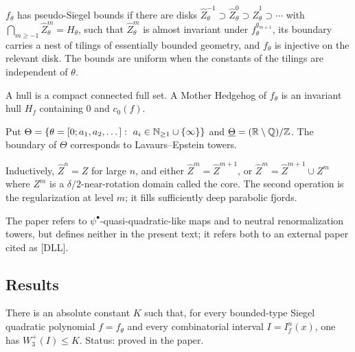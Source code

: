\begin{definition}
\label{def:neutral-pseudo-siegel}
$f_\theta$ has pseudo-Siegel bounds if there are disks
$\widehat Z^{-1}_\theta\supset\widehat Z^0_\theta\supset\widehat Z^1_\theta\supset\cdots$ with
$\bigcap_{m\ge-1}\widehat Z^m_\theta=H_\theta$, such that $\widehat Z^m_\theta$ is almost invariant
under $f_\theta^{q_{m+1}}$, its boundary carries a nest of tilings of essentially bounded
geometry, and $f_\theta$ is injective on the relevant disk.  The bounds are uniform when the
constants of the tilings are independent of $\theta$.
\end{definition}

\begin{definition}
\label{def:neutral-hedgehog}
A hull is a compact connected full set.  A Mother Hedgehog of $f_\theta$ is an invariant hull
$H_f$ containing $0$ and $c_0(f)$.
\end{definition}

\begin{definition}
\label{def:neutral-theta}
Put $\Theta=\{\theta=[0;a_1,a_2,\dots]:\ a_i\in\N_{\ge1}\cup\{\infty\}\}$ and
$\underline\Theta=(\mathbb R\setminus\mathbb Q)/\mathbb Z$.  The boundary of $\Theta$ corresponds to Lavaurs--Epstein
towers.
\end{definition}

\begin{definition}
\label{def:neutral-delta}
Inductively, $\widehat Z^n=Z$ for large $n$, and either $\widehat Z^m=\widehat Z^{m+1}$, or
$\widehat Z^m=\widehat Z^{m+1}\cup Z^m$ where $Z^m$ is a $\delta/2$-near-rotation domain called the
core.  The second operation is the regularization at level $m$; it fills sufficiently deep
parabolic fjords.
\end{definition}

\begin{remark}
The paper refers to $\psi^\bullet$-quasi-quadratic-like maps and to neutral renormalization
towers, but defines neither in the present text; it refers both to an external paper cited as
{[DLL]}.
\end{remark}

\subsection*{Results}

\begin{theorem}
\label{thm:neutral-1-1}
There is an absolute constant $K$ such that, for every bounded-type Siegel quadratic polynomial
$f=f_\theta$ and every combinatorial interval $I=I^n_f(x)$, one has $W^+_3(I)\le K$.  Status:
proved in the paper.
\end{theorem}


